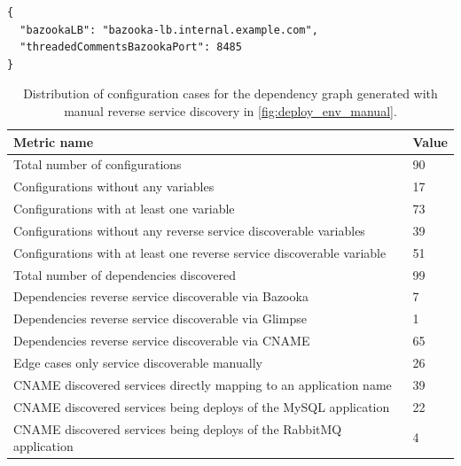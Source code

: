 \begin{lstlisting}[caption=Example configuration of an application in Bazooka,label=list:bazookaconfexamplesplit]
{
  "bazookaLB": "bazooka-lb.internal.example.com",
  "threadedCommentsBazookaPort": 8485
}
\end{lstlisting}


\begin{table}
  \caption{Distribution of configuration cases for the dependency graph generated with manual reverse service discovery in \autoref{fig:deploy_env_manual}.}
  \label{tab:env_var_percentages}
  \begin{tabular}{ |l|l| }
    \hline
    Metric name & Value \\
    \hline
    Total number of configurations & 90 \\
    \hline
    Configurations without any variables & 17 \\
    Configurations with at least one variable & 73 \\
    \hline
    Configurations without any reverse service discoverable variables & 39 \\
    Configurations with at least one reverse service discoverable variable & 51 \\
    \hline
    Total number of dependencies discovered & 99 \\
    \hline
    Dependencies reverse service discoverable via Bazooka & 7 \\
    Dependencies reverse service discoverable via Glimpse & 1 \\
    Dependencies reverse service discoverable via CNAME & 65 \\
    Edge cases only service discoverable manually & 26 \\
    \hline
    CNAME discovered services directly mapping to an application name & 39 \\
    CNAME discovered services being deploys of the MySQL application & 22 \\
    CNAME discovered services being deploys of the RabbitMQ application & 4 \\
    \hline
  \end{tabular}
\end{table}

